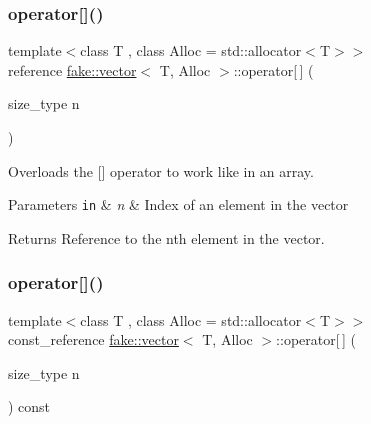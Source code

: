 \subsubsection{\texorpdfstring{operator[]()}{operator[]()}\hspace{0.1cm}{\footnotesize\ttfamily [1/2]}}
{\footnotesize\ttfamily template$<$class T , class Alloc  = std\+::allocator$<$\+T$>$$>$ \\
reference \mbox{\hyperlink{classfake_1_1vector}{fake\+::vector}}$<$ T, Alloc $>$\+::operator\mbox{[}$\,$\mbox{]} (\begin{DoxyParamCaption}\item[{size\+\_\+type}]{n }\end{DoxyParamCaption})\hspace{0.3cm}{\ttfamily [inline]}}



Overloads the \mbox{[}\mbox{]} operator to work like in an array. 


\begin{DoxyParams}[1]{Parameters}
\mbox{\tt in}  & {\em n} & Index of an element in the vector\\
\hline
\end{DoxyParams}
\begin{DoxyReturn}{Returns}
Reference to the n\textquotesingle{}th element in the vector. 
\end{DoxyReturn}
\mbox{\label{classfake_1_1vector_aabd2d9852edba68b74b45a0309583b9e}} 
\subsubsection{\texorpdfstring{operator[]()}{operator[]()}\hspace{0.1cm}{\footnotesize\ttfamily [2/2]}}
{\footnotesize\ttfamily template$<$class T , class Alloc  = std\+::allocator$<$\+T$>$$>$ \\
const\+\_\+reference \mbox{\hyperlink{classfake_1_1vector}{fake\+::vector}}$<$ T, Alloc $>$\+::operator\mbox{[}$\,$\mbox{]} (\begin{DoxyParamCaption}\item[{size\+\_\+type}]{n }\end{DoxyParamCaption}) const\hspace{0.3cm}{\ttfamily [inline]}}



